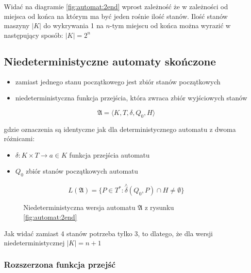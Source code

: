 \documentclass{../notatki}
\begin{document}
Widać na diagramie \ref{fig:automat:2end} wprost zależność że w zależności od miejsca od końca na którym ma być jeden rośnie ilość stanów.
Ilość stanów maszyny $|K|$ do wykrywania 1 na $n$-tym miejscu od końca można wyrazić w następujący sposób: $|K| = 2^n$ 

\subsection{Niedeterministyczne automaty skończone}

\begin{itemize}
    \item zamiast jednego stanu początkowego jest zbiór stanów początkowych
    \item niedeterministyczna funkcja przejścia, która zwraca zbiór wyjściowych stanów
\end{itemize}

$$
\mathfrak{A} = \langle K,T,\delta,Q_0,H \rangle 
$$

gdzie oznaczenia są identyczne jak dla deterministycznego automatu z dwoma różnicami:

\begin{itemize}
    \item $\delta: K \times T \rightarrow a \in K$  funkcja przejścia automatu
    \item $Q_0$ zbiór stanów początkowych automatu
\end{itemize}

$$
L(\mathfrak{A}) = \{P \in T^* : \stackrel{\wedge}{\delta}(Q_0, P) \cap H \ne \emptyset\}
$$

\begin{figure}[H]
    \centering
    \caption{Niedeterministyczna wersja automatu $\mathfrak{A}$ z rysunku \ref{fig:automat:2end}}
    \label{fig:automat:2end-ndet}
\end{figure}

Jak widać zamiast 4 stanów potrzeba tylko 3, to dlatego, że dla wersji niedeterministycznej $|K| = n + 1$

\subsubsection{Rozszerzona funkcja przejść}
\end{document}
